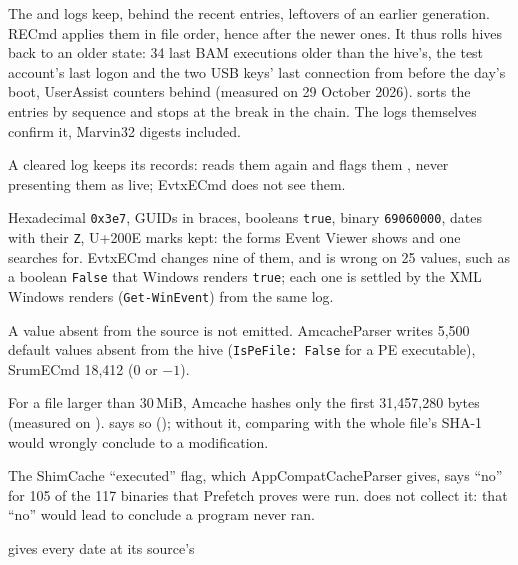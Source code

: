 \documentclass[11pt,a4paper,oneside]{report}
\begin{document}
\begin{description}[style=nextline,leftmargin=1em]
  \item[Hive logs replayed in order] The  and  logs
        keep, behind the recent entries, leftovers of an earlier generation.
        RECmd applies them in file order, hence after the newer ones. It thus
        rolls hives back to an older state: 34 last BAM executions older than
        the hive's, the test account's last logon and the two USB keys' last
        connection from before the day's boot, UserAssist counters behind
        (measured on 29 October 2026). \wac{} sorts the entries by
        sequence and stops at the break in the chain. The logs themselves confirm
        it, Marvin32 digests included.
  \item[Events of cleared logs] A cleared log keeps its records: \wac{} reads
        them again and flags them , never presenting them as
        live; EvtxECmd does not see them.
  \item[Event values as Windows renders them] Hexadecimal \texttt{0x3e7}, GUIDs
        in braces, booleans \texttt{true}, binary \texttt{69060000}, dates with
        their \texttt{Z}, U+200E marks kept: the forms Event Viewer shows and one
        searches for. EvtxECmd changes nine of them, and is wrong on 25 values,
        such as a boolean \texttt{False} that Windows renders \texttt{true};
        each one is settled by the XML Windows renders (\texttt{Get-WinEvent})
        from the same log.
  \item[Nothing invented] A value absent from the source is not emitted.
        AmcacheParser writes 5,500 default values absent from the hive
        (\texttt{IsPeFile: False} for a PE executable), SrumECmd 18,412 (0 or
        $-1$).
  \item[Partial Amcache SHA-1 flagged] For a file larger than 30\,MiB, Amcache
        hashes only the first 31,457,280 bytes (measured on ).
        \wac{} says so (); without it, comparing with the
        whole file's SHA-1 would wrongly conclude to a modification.
  \item[No misleading field] The ShimCache ``executed'' flag, which
        AppCompatCacheParser gives, says ``no'' for 105 of the 117 binaries that
        Prefetch proves were run. \wac{} does not collect it: that ``no'' would
        lead to conclude a program never ran.
  \item[Precision to 100\,ns] \wac{} gives every date at its source's

\end{description}
\end{document}
